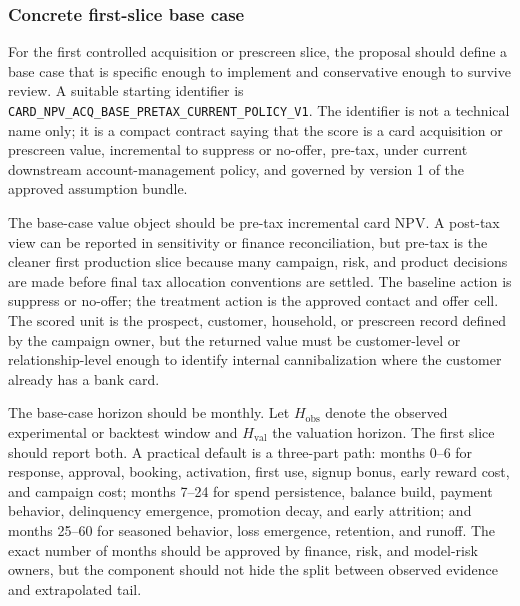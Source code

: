 \documentclass[11pt]{article}
\newcommand{\1}{\mathbf{1}}
\newcommand{\code}[1]{\nolinkurl{#1}}
\begin{document}
\subsubsection{Concrete first-slice base case}
\label{subsec:first-slice-valuation-base}

For the first controlled acquisition or prescreen slice, the proposal should
define a base case that is specific enough to implement and conservative
enough to survive review. A suitable starting identifier is
\code{CARD_NPV_ACQ_BASE_PRETAX_CURRENT_POLICY_V1}. The identifier is not a
technical name only; it is a compact contract saying that the score is a card
acquisition or prescreen value, incremental to suppress or no-offer, pre-tax,
under current downstream account-management policy, and governed by version 1
of the approved assumption bundle.

The base-case value object should be pre-tax incremental card NPV. A post-tax
view can be reported in sensitivity or finance reconciliation, but pre-tax is
the cleaner first production slice because many campaign, risk, and product
decisions are made before final tax allocation conventions are settled. The
baseline action is suppress or no-offer; the treatment action is the approved
contact and offer cell. The scored unit is the prospect, customer, household,
or prescreen record defined by the campaign owner, but the returned value must
be customer-level or relationship-level enough to identify internal
cannibalization where the customer already has a bank card.

The base-case horizon should be monthly. Let $H_{\mathrm{obs}}$ denote the
observed experimental or backtest window and $H_{\mathrm{val}}$ the valuation
horizon. The first slice should report both. A practical default is a
three-part path: months 0--6 for response, approval, booking, activation,
first use, signup bonus, early reward cost, and campaign cost; months 7--24
for spend persistence, balance build, payment behavior, delinquency emergence,
promotion decay, and early attrition; and months 25--60 for seasoned behavior,
loss emergence, retention, and runoff. The exact number of months should be
approved by finance, risk, and model-risk owners, but the component should not
hide the split between observed evidence and extrapolated tail.
\end{document}
